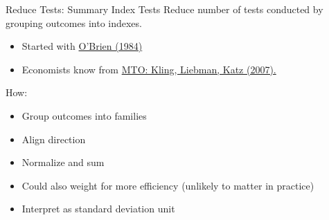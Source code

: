 \documentclass{beamer}
\begin{document}
{ %
    \begin{frame}[plain]
     \end{frame}
}
\begin{frame}{Reduce Tests: Summary Index Tests}
Reduce number of tests conducted by grouping outcomes into indexes.
\begin{itemize}
\item Started with \href{http://www.jstor.org/stable/2531158}{O'Brien (1984)}
\item Economists know from \href{https://scholar.harvard.edu/lkatz/publications/experimental-analysis-neighborhood-effects}{MTO: Kling, Liebman, Katz (2007).}
\end{itemize}
How:
\begin{itemize}
\item Group outcomes into families
\item Align direction
\item Normalize and sum
\item Could also weight for more efficiency (unlikely to matter in practice)
\item Interpret as standard deviation unit
\end{itemize}
\end{frame}
\end{document}
